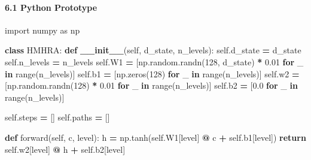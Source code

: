 \documentclass[
  11pt,
  a4paper,
]{article}
\newenvironment{Shaded}{\begin{snugshade}}{\end{snugshade}}
\newcommand{\BuiltInTok}[1]{#1}
\newcommand{\ControlFlowTok}[1]{\textcolor[rgb]{0.13,0.29,0.53}{\textbf{#1}}}
\newcommand{\DecValTok}[1]{\textcolor[rgb]{0.00,0.00,0.81}{#1}}
\newcommand{\FloatTok}[1]{\textcolor[rgb]{0.00,0.00,0.81}{#1}}
\newcommand{\FunctionTok}[1]{\textcolor[rgb]{0.13,0.29,0.53}{\textbf{#1}}}
\newcommand{\ImportTok}[1]{#1}
\newcommand{\KeywordTok}[1]{\textcolor[rgb]{0.13,0.29,0.53}{\textbf{#1}}}
\newcommand{\NormalTok}[1]{#1}
\newcommand{\OperatorTok}[1]{\textcolor[rgb]{0.81,0.36,0.00}{\textbf{#1}}}
\newcommand{\VariableTok}[1]{\textcolor[rgb]{0.00,0.00,0.00}{#1}}
\begin{document}
\paragraph{6.1 Python Prototype}\label{python-prototype}

\begin{Shaded}
\begin{Highlighting}[]
\ImportTok{import}\NormalTok{ numpy }\ImportTok{as}\NormalTok{ np}

\KeywordTok{class}\NormalTok{ HMHRA:}
    \KeywordTok{def} \FunctionTok{\_\_init\_\_}\NormalTok{(}\VariableTok{self}\NormalTok{, d\_state, n\_levels):}
        \VariableTok{self}\NormalTok{.d\_state }\OperatorTok{=}\NormalTok{ d\_state}
        \VariableTok{self}\NormalTok{.n\_levels }\OperatorTok{=}\NormalTok{ n\_levels}
        \VariableTok{self}\NormalTok{.W1 }\OperatorTok{=}\NormalTok{ [np.random.randn(}\DecValTok{128}\NormalTok{, d\_state) }\OperatorTok{*} \FloatTok{0.01} \ControlFlowTok{for}\NormalTok{ \_ }\KeywordTok{in} \BuiltInTok{range}\NormalTok{(n\_levels)]}
        \VariableTok{self}\NormalTok{.b1 }\OperatorTok{=}\NormalTok{ [np.zeros(}\DecValTok{128}\NormalTok{) }\ControlFlowTok{for}\NormalTok{ \_ }\KeywordTok{in} \BuiltInTok{range}\NormalTok{(n\_levels)]}
        \VariableTok{self}\NormalTok{.w2 }\OperatorTok{=}\NormalTok{ [np.random.randn(}\DecValTok{128}\NormalTok{) }\OperatorTok{*} \FloatTok{0.01} \ControlFlowTok{for}\NormalTok{ \_ }\KeywordTok{in} \BuiltInTok{range}\NormalTok{(n\_levels)]}
        \VariableTok{self}\NormalTok{.b2 }\OperatorTok{=}\NormalTok{ [}\FloatTok{0.0} \ControlFlowTok{for}\NormalTok{ \_ }\KeywordTok{in} \BuiltInTok{range}\NormalTok{(n\_levels)]}
        
        \VariableTok{self}\NormalTok{.steps }\OperatorTok{=}\NormalTok{ []}
        \VariableTok{self}\NormalTok{.paths }\OperatorTok{=}\NormalTok{ []}
    
    \KeywordTok{def}\NormalTok{ forward(}\VariableTok{self}\NormalTok{, c, level):}
\NormalTok{        h }\OperatorTok{=}\NormalTok{ np.tanh(}\VariableTok{self}\NormalTok{.W1[level] }\OperatorTok{@}\NormalTok{ c }\OperatorTok{+} \VariableTok{self}\NormalTok{.b1[level])}
        \ControlFlowTok{return} \VariableTok{self}\NormalTok{.w2[level] }\OperatorTok{@}\NormalTok{ h }\OperatorTok{+} \VariableTok{self}\NormalTok{.b2[level]}
    

\end{Highlighting}
\end{Shaded}
\end{document}

